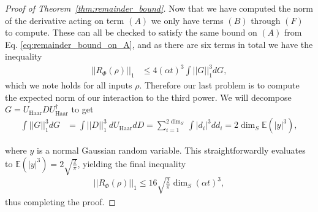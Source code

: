 \documentclass[
 amsmath,amssymb,
 aps,
onecolumn, 
nofootinbib]{revtex4-2}
\newcommand{\abs}[1]{\left| #1 \right|}
\newcommand{\norm}[1]{\left|\left| #1 \right|\right|}
\begin{document}
\begin{proof}[Proof of Theorem~\ref{thm:remainder_bound}]
Now that we have computed the norm of the derivative acting on term $(A)$ we only have terms $(B)$ through $(F)$ to compute. These can all be checked to satisfy the same bound on $(A)$ from Eq. \eqref{eq:remainder_bound_on_A}, and as there are six terms in total we have the inequality
\begin{align}
    \norm{R_{\Phi}(\rho)}_1 &\le 4 (\alpha t)^3 \int \norm{G}_1^3 dG,
\end{align}
which we note holds for all inputs $\rho$. Therefore our last problem is to compute the expected norm of our interaction to the third power. We will decompose $G = U_{\text{Haar}} D U_{\text{Haar}}^\dagger $ to get
\begin{align}
    \int \norm{G}_1^3 dG &= \int \norm{D}_1^3 ~ dU_{\text{Haar}} dD = \sum_{i = 1}^{2 \dim_S} \int \abs{d_i}^3 dd_i = 2 \dim_S \mathbb{E}(\abs{y}^3),
\end{align}

where $y$ is a normal Gaussian random variable. This straightforwardly evaluates to $\mathbb{E}( |y|^3) = 2\sqrt{ \frac{2}{\pi}}$, yielding the final inequality
\begin{align}
    \norm{R_{\Phi}(\rho)}_1 \le 16 \sqrt{\frac{2}{\pi}} \dim_S (\alpha t)^3 ,
\end{align}
thus completing the proof.
\end{proof}
\end{document}
